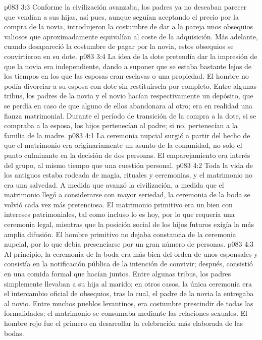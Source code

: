 \vs p083 3:3 Conforme la civilización avanzaba, los padres ya no deseaban parecer que vendían a sus hijas, así pues, aunque seguían aceptando el precio por la compra de la novia, introdujeron la costumbre de dar a la pareja unos obsequios valiosos que aproximadamente equivalían al coste de la adquisición. Más adelante, cuando desapareció la costumbre de pagar por la novia, estos obsequios se convirtieron en su dote.
\vs p083 3:4 La idea de la dote pretendía dar la impresión de que la novia era independiente, dando a suponer que se estaba bastante lejos de los tiempos en los que las esposas eran esclavas o una propiedad. El hombre no podía divorciar a su esposa con dote sin restituírsela por completo. Entre algunas tribus, los padres de la novia y el novio hacían respectivamente un depósito, que se perdía en caso de que alguno de ellos abandonara al otro; era en realidad una fianza matrimonial. Durante el período de transición de la compra a la dote, si se compraba a la esposa, los hijos pertenecían al padre; si no, pertenecían a la familia de la madre.
\vs p083 4:1 La ceremonia nupcial surgió a partir del hecho de que el matrimonio era originariamente un asunto de la comunidad, no solo el punto culminante en la decisión de dos personas. El emparejamiento era interés del grupo, al mismo tiempo que una cuestión personal.
\vs p083 4:2 \pc Toda la vida de los antiguos estaba rodeada de magia, rituales y ceremonias, y el matrimonio no era una salvedad. A medida que avanzó la civilización, a medida que el matrimonio llegó a considerarse con mayor seriedad, la ceremonia de la boda se volvió cada vez más pretenciosa. El matrimonio primitivo era un bien con intereses patrimoniales, tal como incluso lo es hoy, por lo que requería una ceremonia legal, mientras que la posición social de los hijos futuros exigía la más amplia difusión. El hombre primitivo no dejaba constancia de la ceremonia nupcial, por lo que debía presenciarse por un gran número de personas.
\vs p083 4:3 Al principio, la ceremonia de la boda era más bien del orden de unos esponsales y consistía en la notificación pública de la intención de convivir; después, consistió en una comida formal que hacían juntos. Entre algunas tribus, los padres simplemente llevaban a su hija al marido; en otros casos, la única ceremonia era el intercambio oficial de obsequios, tras lo cual, el padre de la novia la entregaba al novio. Entre muchos pueblos levantinos, era costumbre prescindir de todas las formalidades; el matrimonio se consumaba mediante las relaciones sexuales. El hombre rojo fue el primero en desarrollar la celebración más elaborada de las bodas.
